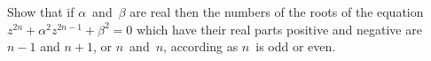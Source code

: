 Show that if $\alpha$~and~$\beta$ are real then the numbers of the roots of the
equation $z^{2n} + \alpha^{2} z^{2n-1} + \beta^{2} = 0$ which have their real parts positive and
negative are $n - 1$ and $n + 1$, or $n$~and~$n$, according as $n$~is odd or even.

